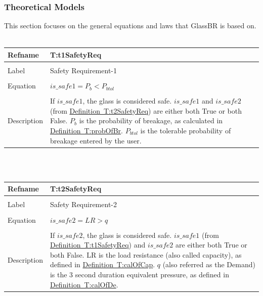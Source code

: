\documentclass[12pt]{article}
\begin{document}
\subsubsection{Theoretical Models}
\label{Sec:TMs}
This section focuses on the general equations and laws that GlassBR is based on.
~\newline
\noindent \begin{minipage}{\textwidth}
\begin{tabular}{p{} p{}}
\toprule \textbf{Refname} & \textbf{T:t1SafetyReq}
\label{T:t1SafetyReq}
\\ \midrule \\
Label & Safety Requirement-1
\\ \midrule \\
Equation & $is\_safe1={P_{b}}<{P_{btol}}$
\\ \midrule \\
Description & If $is\_safe1$, the glass is considered safe. $is\_safe1$ and $is\_safe2$ (from \hyperref[T:t2SafetyReq]{Definition~T:t2SafetyReq}) are either both True or both False. ${P_{b}}$ is the probability of breakage, as calculated in \hyperref[T:probOfBr]{Definition~T:probOfBr}. ${P_{btol}}$ is the tolerable probability of breakage entered by the user.
\\ \bottomrule \end{tabular}
\end{minipage}\\
~\newline
\noindent \begin{minipage}{\textwidth}
\begin{tabular}{p{} p{}}
\toprule \textbf{Refname} & \textbf{T:t2SafetyReq}
\label{T:t2SafetyReq}
\\ \midrule \\
Label & Safety Requirement-2
\\ \midrule \\
Equation & $is\_safe2=LR>q$
\\ \midrule \\
Description & If $is\_safe2$, the glass is considered safe. $is\_safe1$ (from \hyperref[T:t1SafetyReq]{Definition~T:t1SafetyReq}) and $is\_safe2$ are either both True or both False. LR is the load resistance (also called capacity), as defined in \hyperref[T:calOfCap]{Definition~T:calOfCap}. $q$ (also referred as the Demand) is the 3 second duration equivalent pressure, as defined in \hyperref[T:calOfDe]{Definition~T:calOfDe}.
\\ \bottomrule \end{tabular}
\end{minipage}\\
\end{document}
